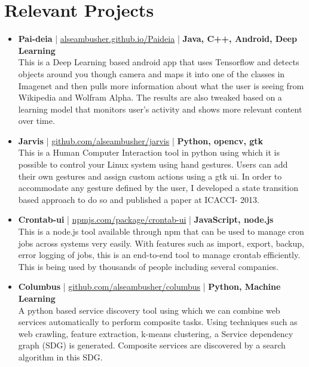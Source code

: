 \section{Relevant Projects}
\begin{itemize}
 \item \textbf{Pai-deia} | \href{http://alseambusher.github.io/Paideia}{alseambusher.github.io/Paideia} | \textbf{Java, C++, Android, Deep Learning}\\
 This is a Deep Learning based android app that uses Tensorflow and detects objects around you though camera and maps it into one of the classes in Imagenet and then pulls more information about what the user is seeing from Wikipedia and Wolfram Alpha. The results are also tweaked based on a learning model that monitors user's activity and shows more relevant content over time.

 \item \textbf{Jarvis} | \href{http://github.com/alseambusher/jarvis}{github.com/alseambusher/jarvis} | \textbf{Python, opencv, gtk}\\
 This is a Human Computer Interaction tool in python using which it is possible to control your Linux system using hand gestures. Users can add their own gestures and assign custom actions using a gtk ui. In order to accommodate any gesture defined by the user, I developed a state transition based approach to do so and published a paper at ICACCI- 2013.

 \item \textbf{Crontab-ui} | \href{http://npmjs.com/package/crontab-ui}{npmjs.com/package/crontab-ui} | \textbf{JavaScript, node.js}\\
 This is a node.js tool available through npm that can be used to manage cron jobs across systems very easily. With features such as import, export, backup, error logging of jobs, this is an end-to-end tool to manage crontab efficiently. This is being used by thousands of people including several companies.

 \item \textbf{Columbus} | \href{http://github.com/alseambusher/columbus}{github.com/alseambusher/columbus} | \textbf{Python, Machine Learning}\\
 A python based service discovery tool using which we can combine web services automatically to perform composite tasks. Using techniques such as web crawling, feature extraction, k-means clustering, a Service dependency graph (SDG) is generated. Composite services are discovered by a search algorithm in this SDG.


\end{itemize}
